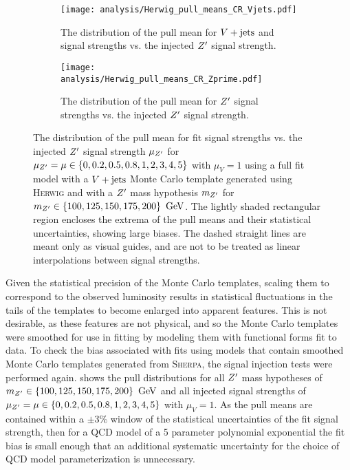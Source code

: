 \begin{figure}[htbp]
 \centering
 \begin{subfigure}[t]{0.48\textwidth}
  \centering
  \texttt{[image: analysis/Herwig\_pull\_means\_CR\_Vjets.pdf]}
  \caption[The distribution of the pull mean for $\Vjets$ and signal strengths vs. the injected $\Zprime$ signal strength.]{%
   The distribution of the pull mean for $\Vjets$ and signal strengths vs. the injected $\Zprime$ signal strength.}
  \label{fig:pulls_Vjets_Herwig}
 \end{subfigure}%
 \quad
 \begin{subfigure}[t]{0.48\textwidth}
  \centering
  \texttt{[image: analysis/Herwig\_pull\_means\_CR\_Zprime.pdf]}
  \caption[The distribution of the pull mean for $\Zprime$ signal strengths vs. the injected $\Zprime$ signal strength.]{%
   The distribution of the pull mean for $\Zprime$ signal strengths vs. the injected $\Zprime$ signal strength.}
  \label{fig:pulls_Zprime_Herwig}
 \end{subfigure}
 \caption[The distribution of the pull mean for fit signal strengths vs. the injected $\Zprime$ signal strength with \textsc{Herwig} Monte Carlo templates.]{%
  The distribution of the pull mean for fit signal strengths vs. the injected $\Zprime$ signal strength $\mu_{Z^{\prime}}$ for $\mu_{Z^{\prime}} = \mu \in \left\{0, 0.2, 0.5, 0.8, 1, 2, 3, 4, 5\right\}$ with $\mu_{V} = 1$ using a full fit model with a $\Vjets$ Monte Carlo template generated using \textsc{Herwig} and with a $\Zprime$ mass hypothesis $m_{Z^{\prime}}$ for
  $m_{Z^{\prime}} \in \left\{100, 125, 150, 175, 200\right\}~\mathrm{GeV}$.
  The lightly shaded rectangular region encloses the extrema of the pull means and their statistical uncertainties, showing large biases.
  The dashed straight lines are meant only as visual guides, and are not to be treated as linear interpolations between signal strengths.}
 \label{fig:pulls_summary_Herwig}
\end{figure}

Given the statistical precision of the Monte Carlo templates, scaling them to correspond to the observed luminosity results in statistical fluctuations in the tails of the templates to become enlarged into apparent features.
This is not desirable, as these features are not physical, and so the Monte Carlo templates were smoothed for use in fitting by modeling them with functional forms fit to data.
To check the bias associated with fits using models that contain smoothed Monte Carlo templates generated from \textsc{Sherpa}, the signal injection tests were performed again.
 shows the pull distributions for all $\Zprime$ mass hypotheses of $m_{Z^{\prime}} \in \left\{100, 125, 150, 175, 200\right\}~\mathrm{GeV}$ and all injected signal strengths of $\mu_{Z^{\prime}} = \mu \in \left\{0, 0.2, 0.5, 0.8, 1, 2, 3, 4, 5\right\}$ with $\mu_{V} = 1$.
As the pull means are contained within a $\pm 3\%$ window of the statistical uncertainties of the fit signal strength, then for a QCD model of a 5 parameter polynomial exponential the fit bias is small enough that an additional systematic uncertainty for the choice of QCD model parameterization is unnecessary.

